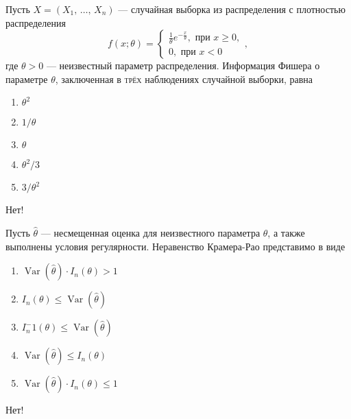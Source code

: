 \documentclass[t]{beamer}
\DeclareMathOperator{\Var}{Var}
\begin{document}
 \begin{frame} \label{24-No} 
\begin{block}{24} 

    Пусть $X = (X_1, \, \ldots, \, X_n)$ — случайная выборка из распределения с плотностью распределения
  \[
      f(x; \theta) =
      \begin{cases}
          \frac{1}{\theta} e^{-\frac{x}{\theta}}, \text{ при } x \geq 0, \\
          0, \text{ при } x < 0
      \end{cases},
  \]
  где $\theta > 0$ — неизвестный параметр распределения. Информация Фишера о параметре $\theta$, заключенная в \textsc{трёх} наблюдениях случайной выборки, равна


 \end{block} 
\begin{enumerate} 
\item[] \hyperlink{24-No}{\beamergotobutton{} $\theta^2$}
\item[] \hyperlink{24-No}{\beamergotobutton{} $1 / \theta$}
\item[] \hyperlink{24-No}{\beamergotobutton{} $\theta$}
\item[] \hyperlink{24-No}{\beamergotobutton{} $\theta^2 / 3$}
\item[] \hyperlink{24-Yes}{\beamergotobutton{} $3 / \theta^2$}
\end{enumerate} 

 \alert{Нет!} 
\end{frame} 


 \begin{frame} \label{25-No} 
\begin{block}{25} 

  Пусть $\hat{\theta}$ — несмещенная оценка для неизвестного параметра $\theta$, а также выполнены условия регулярности. Неравенство Крамера-Рао представимо в виде


 \end{block} 
\begin{enumerate} 
\item[] \hyperlink{25-No}{\beamergotobutton{} $\Var(\hat\theta) \cdot I_n(\theta) > 1$}
\item[] \hyperlink{25-No}{\beamergotobutton{} $I_n(\theta) \leq \Var(\hat\theta)$}
\item[] \hyperlink{25-Yes}{\beamergotobutton{} $I_n^-1(\theta) \leq \Var(\hat\theta)$}
\item[] \hyperlink{25-No}{\beamergotobutton{} $\Var(\hat\theta) \leq I_n(\theta)$}
\item[] \hyperlink{25-No}{\beamergotobutton{} $\Var(\hat\theta) \cdot I_n(\theta) \leq 1$}
\end{enumerate} 

 \alert{Нет!} 
\end{frame} 
\end{document}
